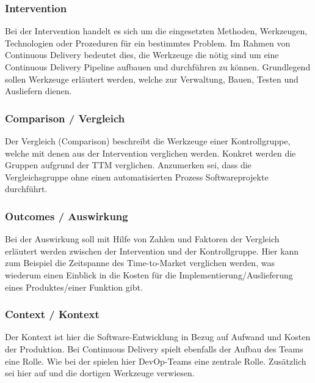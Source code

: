 \subsubsection*{Intervention}
\label{picoc:Interventation}
Bei der Intervention handelt es sich um die eingesetzten Methoden, Werkzeugen, Technologien oder Prozeduren für ein bestimmtes Problem. Im Rahmen von Continuous Delivery bedeutet dies, die Werkzeuge die nötig sind um eine Continuous Delivery Pipeline aufbauen und durchführen zu können. Grundlegend sollen Werkzeuge erläutert werden, welche zur Verwaltung, Bauen, Testen und Ausliefern dienen.

\subsubsection*{Comparison / Vergleich}
\label{picoc:Comparison}
Der Vergleich (Comparison) beschreibt die Werkzeuge einer Kontrollgruppe, welche mit denen aus der Intervention verglichen werden. Konkret werden die Gruppen aufgrund der TTM verglichen. Anzumerken sei, dass die Vergleichsgruppe ohne einen automatisierten Prozess Softwareprojekte durchführt.

\subsubsection*{Outcomes / Auswirkung}
\label{picoc:Outcomes}
Bei der Auswirkung soll mit Hilfe von Zahlen und Faktoren der Vergleich erläutert werden zwischen der Intervention und der Kontrollgruppe. Hier kann zum Beispiel die Zeitspanne des Time-to-Market verglichen werden, was wiederum einen Einblick in die Kosten für die Implementierung/Auslieferung eines Produktes/einer Funktion gibt.

\subsubsection*{Context / Kontext}
\label{picoc:Context}
Der Kontext ist hier die Software-Entwicklung in Bezug auf Aufwand und Kosten der Produktion. Bei Continuous Delivery spielt ebenfalls der Aufbau des Teams eine Rolle. Wie bei der  spielen hier DevOp-Teams eine zentrale Rolle. Zusätzlich sei hier auf  und die dortigen Werkzeuge verwiesen.

